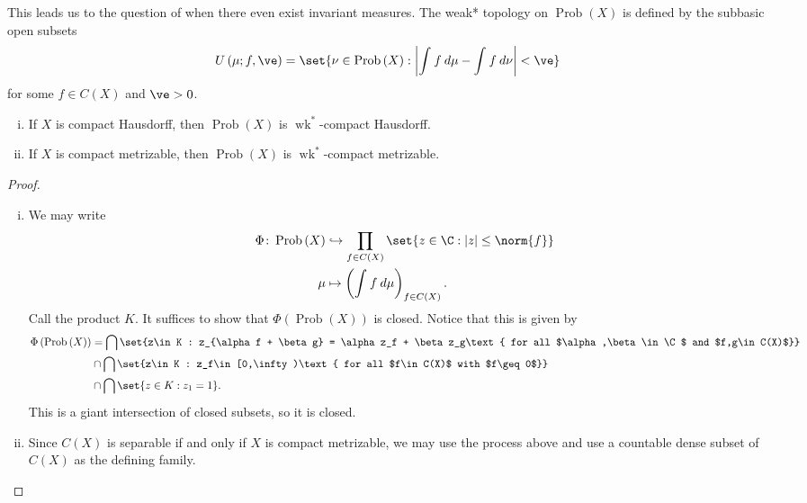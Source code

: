 \documentclass[10pt]{mypackage}
\begin{document}
This leads us to the question of when there even exist invariant measures. The weak* topology on $\operatorname{Prob}\left( X \right)$ is defined by the subbasic open subsets
\begin{align*}
  U\left( \mu;f,\ve \right) &= \set{\nu\in \operatorname{Prob}\left( X \right) : \left\vert \int_{}^{} f\:d\mu - \int_{}^{} f\:d\nu \right\vert < \ve}
\end{align*}
for some $f\in C(X)$ and $\ve > 0$.
\begin{proposition}\hfill
  \begin{enumerate}[(i)]
    \item If $X$ is compact Hausdorff, then $\operatorname{Prob}\left( X \right)$ is $\operatorname{wk}^{\ast}$-compact Hausdorff.
    \item If $X$ is compact metrizable, then $\operatorname{Prob}\left( X \right)$ is $\operatorname{wk}^{\ast}$-compact metrizable.
  \end{enumerate}
\end{proposition}
\begin{proof}\hfill
  \begin{enumerate}[(i)]
    \item We may write
      \begin{align*}
        \Phi\colon \operatorname{Prob}\left( X \right) &\hookrightarrow \prod_{f\in C(X)}\set{z\in \C : \left\vert z \right\vert\leq \norm{f}}\\
        \mu &\mapsto \left( \int_{}^{} f\:d\mu \right)_{f\in C(X)}.
      \end{align*}
      Call the product $K$. It suffices to show that $\Phi\left( \operatorname{Prob}\left( X \right) \right)$ is closed. Notice that this is given by
      \begin{align*}
        \Phi\left( \operatorname{Prob}\left( X \right) \right) &= \bigcap\set{z\in K : z_{\alpha f + \beta g} = \alpha z_f + \beta z_g\text{ for all $\alpha,\beta\in \C$ and $f,g\in C(X)$}}\\
                                                               &\cap \bigcap\set{z\in K : z_f\in [0,\infty)\text{ for all $f\in C(X)$ with $f\geq 0$}}\\
                                                               &\cap \bigcap\set{z\in K : z_1 = 1}.
      \end{align*}
      This is a giant intersection of closed subsets, so it is closed.
    \item Since $C(X)$ is separable if and only if $X$ is compact metrizable, we may use the process above and use a countable dense subset of $C(X)$ as the defining family.
  \end{enumerate}
\end{proof}
\end{document}
